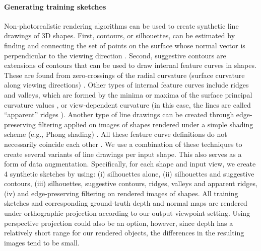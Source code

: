 \documentclass[10pt, conference, compsocconf]{IEEEtran}
\begin{document}
\vspace{-1mm}\paragraph{Generating training sketches} Non-photorealistic rendering algorithms can be used to create synthetic line drawings of 3D shapes. 
First, contours, or silhouettes, can be estimated by finding and connecting the  set  of  points on  the  surface whose normal vector is perpendicular to the viewing direction \cite{decarlo2003suggestive}. Second, suggestive contours are extensions of contours that can be used to draw internal feature curves in shapes. These are found from zero-crossings of the radial curvature (surface curvature along viewing directions) \cite{decarlo2003suggestive}. Other types of internal feature curves include ridges and valleys, which are formed by the minima or maxima of the surface principal curvature values \cite{Ohtake:2004:RLM},
or view-dependent curvature (in this case, the lines are called ``apparent'' ridges \cite{apparentridges}). Another type of line drawings can be created through edge-preserving filtering \cite{GastalOliveira2011} applied on  images of shapes  rendered under a simple shading scheme (e.g., Phong shading) \cite{Phong:1975:ICG}. All these feature curve definitions do not necessarily coincide each other  \cite{cole2008people}. 
We use a combination of these techniques to create several variants of line drawings per input shape. This also serves as a form of data augmentation. Specifically, for each shape and input view, we create 4 synthetic sketches by using: (i) silhouettes alone, (ii) silhouettes and suggestive contours, (iii)  silhouettes, suggestive contours, ridges, valleys and apparent ridges, (iv) and edge-preserving filtering on  rendered images of shapes. 
All training sketches and corresponding ground-truth depth and normal maps are rendered under orthographic projection according to our output viewpoint setting. Using perspective projection could also be an option, however, since  depth has  a relatively short range for our rendered objects, the differences in the resulting images tend to be small. 
\end{document}

